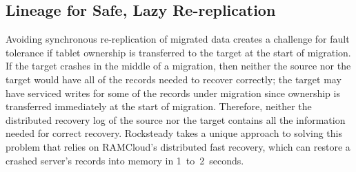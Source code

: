\subsection{Lineage for Safe, Lazy Re-replication}
\label{sec:log-dep}

%
%

Avoiding synchronous re-replication of migrated data creates a
challenge for fault tolerance if tablet ownership is transferred to the target
at the start of migration. If the target crashes in the middle of a migration,
then neither the source nor the target would have all of the records needed to
recover correctly; the target may have serviced writes for some of the records
under migration since ownership is transferred immediately at the start of
migration.  Therefore, neither the distributed recovery log
of the source nor the target contains all the information needed for correct
recovery. Rocksteady takes a unique approach to solving this problem that
relies on RAMCloud's distributed fast recovery, which can restore a crashed
server's records into memory in 1~to~2~seconds.

